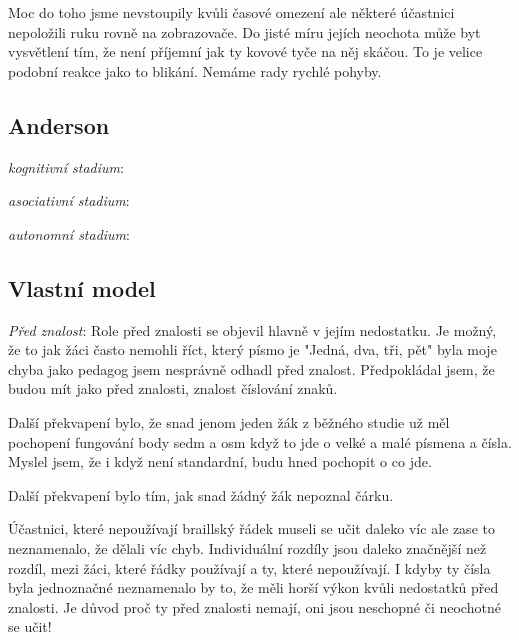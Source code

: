 Moc do toho jsme nevstoupily kvůli časové omezení ale některé účastnici nepoložili ruku rovně na zobrazovače.  Do jisté míru jejích neochota může byt vysvětlení tím, že není příjemní jak ty kovové tyče na něj skáčou.  To je velice podobní reakce jako to blikání.  Nemáme rady rychlé pohyby.

\subsection{Anderson}

\textit{kognitivní stadium}:

\textit{asociativní stadium}:

\textit{autonomní stadium}:

\subsection{Vlastní model}

\textit{Před znalost}:
Role před znalosti se objevil hlavně v jejím nedostatku.
Je možný, že to jak žáci často nemohli říct, který písmo je "Jedná, dva, tři, pět" byla moje chyba jako pedagog jsem nesprávně odhadl před znalost.  Předpokládal jsem, že budou mít jako před znalosti, znalost číslování znaků. 

Další překvapení bylo, že snad jenom jeden žák z běžného studie už měl pochopení fungování body sedm a osm když to jde o velké a malé písmena a čísla.  Myslel jsem, že i když není standardní, budu hned pochopit o co jde.

Další překvapení bylo tím, jak snad žádný žák nepoznal čárku.

Účastnici, které nepoužívají braillský řádek museli se učit daleko víc ale zase to neznamenalo, že dělali víc chyb. Individuální rozdíly jsou daleko značnější než rozdíl, mezi žáci, které řádky používají a ty, které nepoužívají.  I kdyby ty čísla byla jednoznačné neznamenalo by to, že měli horší výkon kvůli nedostatků před znalosti.  Je důvod proč ty před znalosti nemají, oni jsou neschopné či neochotné se učit!
